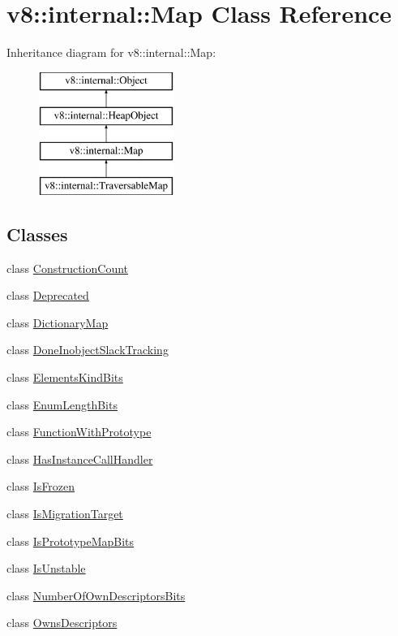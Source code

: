 \hypertarget{classv8_1_1internal_1_1_map}{}\section{v8\+:\+:internal\+:\+:Map Class Reference}
\label{classv8_1_1internal_1_1_map}
Inheritance diagram for v8\+:\+:internal\+:\+:Map\+:\begin{figure}[H]
\begin{center}
\leavevmode
\includegraphics[height=4.000000cm]{classv8_1_1internal_1_1_map}
\end{center}
\end{figure}
\subsection*{Classes}
\begin{DoxyCompactItemize}
\item 
class \hyperlink{classv8_1_1internal_1_1_map_1_1_construction_count}{Construction\+Count}
\item 
class \hyperlink{classv8_1_1internal_1_1_map_1_1_deprecated}{Deprecated}
\item 
class \hyperlink{classv8_1_1internal_1_1_map_1_1_dictionary_map}{Dictionary\+Map}
\item 
class \hyperlink{classv8_1_1internal_1_1_map_1_1_done_inobject_slack_tracking}{Done\+Inobject\+Slack\+Tracking}
\item 
class \hyperlink{classv8_1_1internal_1_1_map_1_1_elements_kind_bits}{Elements\+Kind\+Bits}
\item 
class \hyperlink{classv8_1_1internal_1_1_map_1_1_enum_length_bits}{Enum\+Length\+Bits}
\item 
class \hyperlink{classv8_1_1internal_1_1_map_1_1_function_with_prototype}{Function\+With\+Prototype}
\item 
class \hyperlink{classv8_1_1internal_1_1_map_1_1_has_instance_call_handler}{Has\+Instance\+Call\+Handler}
\item 
class \hyperlink{classv8_1_1internal_1_1_map_1_1_is_frozen}{Is\+Frozen}
\item 
class \hyperlink{classv8_1_1internal_1_1_map_1_1_is_migration_target}{Is\+Migration\+Target}
\item 
class \hyperlink{classv8_1_1internal_1_1_map_1_1_is_prototype_map_bits}{Is\+Prototype\+Map\+Bits}
\item 
class \hyperlink{classv8_1_1internal_1_1_map_1_1_is_unstable}{Is\+Unstable}
\item 
class \hyperlink{classv8_1_1internal_1_1_map_1_1_number_of_own_descriptors_bits}{Number\+Of\+Own\+Descriptors\+Bits}
\item 
class \hyperlink{classv8_1_1internal_1_1_map_1_1_owns_descriptors}{Owns\+Descriptors}
\end{DoxyCompactItemize}
